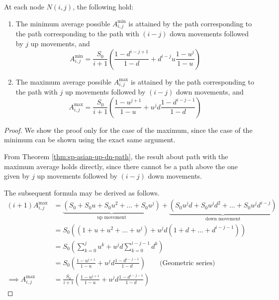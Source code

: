 \begin{crr}
	\label{crr:sp-asian-up-dn-path}
	At each node $ N(i,j) $, the following hold:
	\begin{enumerate}
	\item The minimum average possible $ A_{i,j}^{\min} $ is attained by the path corresponding to the path corresponding to the path with $(i-j)$ down movements followed by $j$ up movements, and
		\begin{equation}	\label{eq:sp-asian-Amin}
			A_{i,j}^{\min} = \frac{S_0}{i+1} \left( \frac{1 - d^{i-j+1}}{1-d} + d^{i-j} u \frac{1 - u^{j}}{1-u} \right)
		\end{equation}
	\item The maximum average possible $ A_{i,j}^{\max} $ is attained by the path corresponding to the path with $j$ up movements followed by $(i-j)$ down movements, and
		\begin{equation} \label{eq:sp-asian-Amax}
			A_{i,j}^{\max} = \frac{S_0}{i+1} \left( \frac{1 - u^{j+1}}{1-u} + u^{j} d \frac{1 - d^{i-j-1}}{1-d} \right)
		\end{equation}
	\end{enumerate}
\end{crr}

\begin{proof}
	We show the proof only for the case of the maximum, since the case of the minimum can be shown using the exact same argument.
	
	From Theorem \ref{thm:sp-asian-up-dn-path}, the result about path with the maximum average holds directly, since there cannot be a path above the one given by $j$ up movements followed by $(i-j)$ down movements.
	
	The subsequent formula may be derived as follows.
	\begin{align*}
		(i+1) A_{i,j}^{\max} &= \underbrace{ ( S_0 + S_0 u + S_0 u^2 + \dots + S_0 u^j ) }_\text{up movement} + \underbrace{ ( S_0 u^j d + S_0 u^j d^2 + \dots + S_0 u^j d^{i-j} ) }_\text{down movement} \\
												 &= S_0 ( (1 + u + u^2 + \dots + u^j ) + u^j d ( 1 + d + \dots + d^{i-j-1} ) ) \\
												 &= S_0 \left( \sum_{k=0}^j u^k + u^j d \sum_{k=0}^{i-j-1} d^k \right) \\
												 &= S_0 \left( \frac{1 - u^{j+1}}{1-u} + u^{j} d \frac{1 - d^{i-j-1}}{1-d} \right) \qquad \text{(Geometric series)} \\
		\implies A_{i,j}^{\max} &= \frac{S_0}{i+1} \left( \frac{1 - u^{j+1}}{1-u} + u^{j} d \frac{1 - d^{i-j-1}}{1-d} \right)
	\end{align*}
\end{proof}

